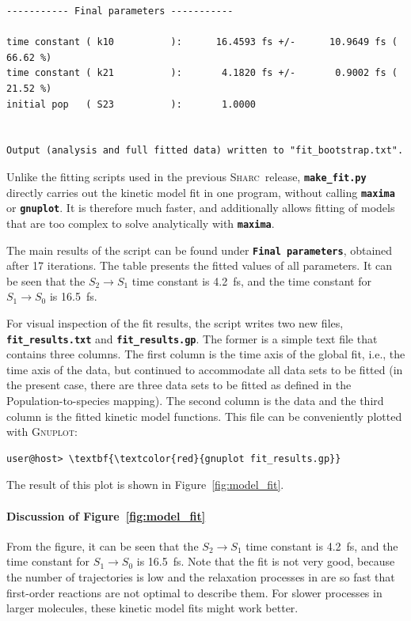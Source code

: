\documentclass[a4paper,11pt,DIV=15,openany]{scrbook}
\newcommand{\sharc}{\textsc{Sharc}}
\newcommand{\ttt}[1]{\textbf{\texttt{#1}}}
\begin{document}
\begin{oframed}
\begin{Verbatim}[commandchars=\\\{\}]
----------- Final parameters -----------

time constant ( k10          ):      16.4593 fs +/-      10.9649 fs (  66.62 %)
time constant ( k21          ):       4.1820 fs +/-       0.9002 fs (  21.52 %)
initial pop   ( S23          ):       1.0000


Output (analysis and full fitted data) written to "fit_bootstrap.txt".
\end{Verbatim}
\end{oframed}

\normalsize

Unlike the fitting scripts used in the previous \sharc\ release, \ttt{make\_fit.py} directly carries out the kinetic model fit in one program, without calling \ttt{maxima} or \ttt{gnuplot}.
It is therefore much faster, and additionally allows fitting of models that are too complex to solve analytically with \ttt{maxima}.

The main results of the script can be found under \ttt{Final parameters}, obtained after 17 iterations.
The table presents the fitted values of all parameters.
It can be seen that the $S_2\rightarrow S_1$ time constant is 4.2~fs, and the time constant for $S_1\rightarrow S_0$ is 16.5~fs.

For visual inspection of the fit results, the script writes two new files, \ttt{fit\_results.txt} and \ttt{fit\_results.gp}.
The former is a simple text file that contains three columns.
The first column is the time axis of the global fit, i.e., the time axis of the data, but continued to accommodate all data sets to be fitted (in the present case, there are three data sets to be fitted as defined in the Population-to-species mapping).
The second column is the data and the third column is the fitted kinetic model functions.
This file can be conveniently plotted with \textsc{Gnuplot}:
\begin{Verbatim}[commandchars=\\\{\}]
user@host> \textbf{\textcolor{red}{gnuplot fit_results.gp}}
\end{Verbatim}
The result of this plot is shown in Figure~\ref{fig:model_fit}.


\paragraph{Discussion of Figure~\ref{fig:model_fit}}

From the figure, it can be seen that the $S_2\rightarrow S_1$ time constant is 4.2~fs, and the time constant for $S_1\rightarrow S_0$ is 16.5~fs.
Note that the fit is not very good, because the number of trajectories is low and the relaxation processes in  are so fast that first-order reactions are not optimal to describe them.
For slower processes in larger molecules, these kinetic model fits might work better.
\end{document}
